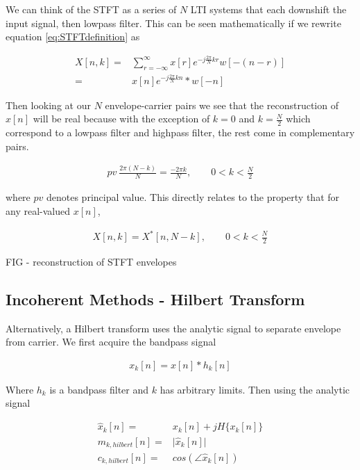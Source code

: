 \documentclass [11pt, proquest] {uwthesis}[2015/03/03]
\begin{document}
We can think of the STFT as a series of $N$ LTI systems that each downshift the input signal, then lowpass filter.  This can be seen mathematically if we rewrite equation \ref{eq:STFTdefinition} as

\begin{align}
\label{eq:STFTasFilter}
X[n,k] =& \sum\limits_{r=-\infty}^{\infty} x[r] e^{-j\frac{2\pi}{N}kr} w[-(n - r)] \nonumber \\
=& x[n] e^{-j\frac{2\pi}{N}kn} * w[-n]
\end{align}

Then looking at our $N$ envelope-carrier pairs we see that the reconstruction of $x[n]$ will be real because with the exception of $k = 0$ and $k = \frac{N}{2}$ which correspond to a lowpass filter and highpass filter, the rest come in complementary pairs.

\begin{align}
pv \ \frac{2\pi (N-k)}{N} = \frac{-2\pi k}{N}, \qquad 0 < k < \frac{N}{2}
\end{align}

where $pv$ denotes principal value.  This directly relates to the property that for any real-valued $x[n]$,

\begin{align}
X[n,k] = X^*[n,N-k], \qquad 0 < k < \frac{N}{2}
\end{align}

FIG - reconstruction of STFT envelopes

\subsection{Incoherent Methods - Hilbert Transform}

Alternatively, a Hilbert transform uses the analytic signal to separate envelope from carrier.  We first acquire the bandpass signal

\begin{align}
x_k[n] = x[n] * h_k[n]
\end{align}

Where $h_k$ is a bandpass filter and $k$ has arbitrary limits.  Then using the analytic signal

\begin{align}
\widehat{x}_k[n] =& x_k[n] + jH\{x_k[n]\} \\
\label{eq:hilbert_envelope}
m_{k,hilbert}[n] =& \vert\widehat{x}_k[n]\vert \\
c_{k,hilbert}[n] =& cos(\angle\widehat{x}_k[n])
\end{align}
\end{document}
